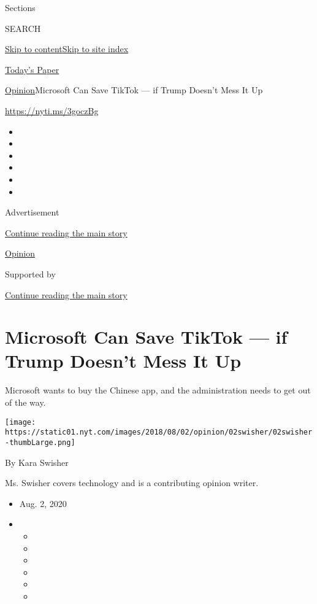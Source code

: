 Sections

SEARCH

\protect\hyperlink{site-content}{Skip to
content}\protect\hyperlink{site-index}{Skip to site index}

\href{https://myaccount.nytimes.com/auth/login?response_type=cookie\&client_id=vi}{}

\href{https://www.nytimes.com/section/todayspaper}{Today's Paper}

\href{/section/opinion}{Opinion}\textbar{}Microsoft Can Save TikTok ---
if Trump Doesn't Mess It Up

\href{https://nyti.ms/3goczBg}{https://nyti.ms/3goczBg}

\begin{itemize}
\item
\item
\item
\item
\item
\item
\end{itemize}

Advertisement

\protect\hyperlink{after-top}{Continue reading the main story}

\href{/section/opinion}{Opinion}

Supported by

\protect\hyperlink{after-sponsor}{Continue reading the main story}

\hypertarget{microsoft-can-save-tiktok--if-trump-doesnt-mess-it-up}{%
\section{Microsoft Can Save TikTok --- if Trump Doesn't Mess It
Up}\label{microsoft-can-save-tiktok--if-trump-doesnt-mess-it-up}}

Microsoft wants to buy the Chinese app, and the administration needs to
get out of the way.

\texttt{[image: https://static01.nyt.com/images/2018/08/02/opinion/02swisher/02swisher-thumbLarge.png]}

By Kara Swisher

Ms. Swisher covers technology and is a contributing opinion writer.

\begin{itemize}
\item
  Aug. 2, 2020
\item
  \begin{itemize}
  \item
  \item
  \item
  \item
  \item
  \item
  \end{itemize}
\end{itemize}

